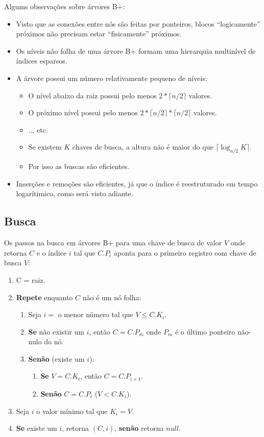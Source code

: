 Algums observações sobre árvores B+:
\begin{itemize}
\item Visto que as conexões entre nós são feitas por ponteiros, 
blocos ``logicamente'' próximos não precisam estar ``fisicamente'' 
próximos.

\item Os níveis não folha de uma árvore B+ formam uma hierarquia 
multinível de índices esparsos.

\item A árvore possui um número relativamente pequeno de níveis:
	\begin{itemize}
	\item O nível abaixo da raiz possui pelo menos $2 * \lceil n/2 \rceil$ valores.
	\item O próximo nível possui pelo menos $2 * \lceil n/2 \rceil * \lceil n/2 \rceil$ valores.
	\item ... etc.
	\item Se existem $K$ chaves de busca, a altura não é maior do que $\lceil \log_{n/2} K \rceil$.
	\item Por isso as buscas são eficientes.
	\end{itemize}
\item Inserções e remoções são eficientes, já que o índice é reestruturado em tempo 
logarítimico, como será visto adiante.
\end{itemize}

\subsection{Busca}

Os passos na busca em árvores B+ para uma chave de busca de valor $V$
onde retorna $C$ e o índice $i$ tal que $C.P_i$ aponta para o primeiro registro
com chave de busca $V$:
\begin{enumerate}
\item C = raiz.
\item \textbf{Repete} enquanto $C$ não é um nó folha:
	\begin{enumerate}
	\item Seja $i= $ o menor número tal que $V \leq C.K_i$.
	\item \textbf{Se} não existir um $i$, então $C = C.P_m$ onde $P_m$ é o último ponteiro não-nulo do nó.
	\item \textbf{Senão} (existe um $i$):
		\begin{enumerate}
		\item \textbf{Se} $V = C.K_i$, então $C = C.P_{i+1}$.
		\item \textbf{Senão} $C = C.P_i$ ($V < C.K_i$).
		\end{enumerate}
	\end{enumerate}
\item Seja $i$ o valor mínimo tal que $K_i = V$.
\item \textbf{Se} existe um $i$, retorna $(C, i)$, \textbf{senão} retorna $null$.
\end{enumerate}

